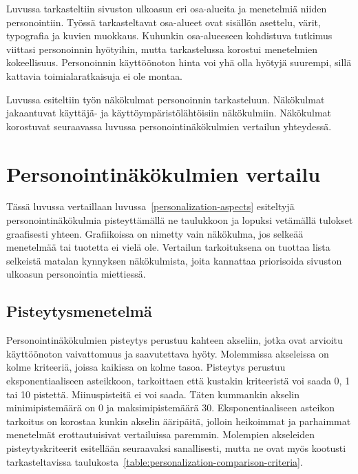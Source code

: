 \documentclass[finnish, 12pt, a4paper, elec, utf8, a-1b, online]{aaltothesis}
\begin{document}
Luvussa tarkasteltiin sivuston ulkoasun eri osa-alueita ja menetelmiä niiden
personointiin. Työssä tarkasteltavat osa-alueet ovat sisällön asettelu, värit,
typografia ja kuvien muokkaus. Kuhunkin osa-alueeseen kohdistuva tutkimus
viittasi personoinnin hyötyihin, mutta tarkastelussa korostui menetelmien
kokeellisuus. Personoinnin käyttöönoton hinta voi yhä olla hyötyjä suurempi,
sillä kattavia toimialaratkaisuja ei ole montaa.

Luvussa esiteltiin työn näkökulmat personoinnin tarkasteluun. Näkökulmat
jakaantuvat käyttäjä- ja käyttöympäristölähtöisiin näkökulmiin. Näkökulmat
korostuvat seuraavassa luvussa personointinäkökulmien vertailun yhteydessä.

\clearpage
\section{Personointinäkökulmien vertailu}\label{personalization-comparison}

Tässä luvussa vertaillaan luvussa~\ref{personalization-aspects} esiteltyjä
personointinäkökulmia pisteyttämällä ne taulukkoon ja lopuksi vetämällä tulokset
graafisesti yhteen. Grafiikoissa on nimetty vain näkökulma, jos selkeää
menetelmää tai tuotetta ei vielä ole. Vertailun tarkoituksena on tuottaa lista
selkeistä matalan kynnyksen näkökulmista, joita kannattaa priorisoida sivuston
ulkoasun personointia miettiessä.

\subsection{Pisteytysmenetelmä}

Personointinäkökulmien pisteytys perustuu kahteen akseliin, jotka ovat arvioitu
käyttöönoton vaivattomuus ja saavutettava hyöty. Molemmissa akseleissa on kolme
kriteeriä, joissa kaikissa on kolme tasoa. Pisteytys perustuu eksponentiaaliseen
asteikkoon, tarkoittaen että kustakin kriteeristä voi saada 0, 1 tai 10
pistettä. Miinuspisteitä ei voi saada. Täten kummankin akselin minimipistemäärä
on 0 ja maksimipistemäärä 30. Eksponentiaaliseen asteikon tarkoitus on korostaa
kunkin akselin ääripäitä, jolloin heikoimmat ja parhaimmat menetelmät
erottautuisivat vertailuissa paremmin. Molempien akseleiden pisteytyskriteerit
esitellään seuraavaksi sanallisesti, mutta ne ovat myös kootusti
tarkasteltavissa taulukosta~\ref{table:personalization-comparison-criteria}.
\end{document}
